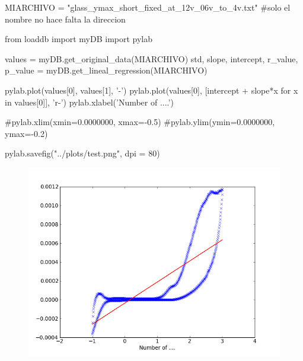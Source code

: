 \documentclass[a4paper,arial,10pt]{article}
\begin{document}
\begin{sagesilent}
MIARCHIVO = "glass_ymax_short_fixed_at_12v_06v_to_4v.txt"
#solo el nombre no hace falta la direccion

from loaddb import myDB
import pylab

values = myDB.get_original_data(MIARCHIVO)
std, slope, intercept, r_value, p_value = myDB.get_lineal_regression(MIARCHIVO)

pylab.plot(values[0], values[1], '-')
pylab.plot(values[0], [intercept + slope*x  for x in values[0]], 'r-')
pylab.xlabel('Number of ....')

#pylab.xlim(xmin=0.0000000, xmax=-0.5)
#pylab.ylim(ymin=0.0000000, ymax=-0.2) 

pylab.savefig("../plots/test.png", dpi = 80)


\end{sagesilent}

\begin{figure}
\begin{center}
        \includegraphics[scale=0.6]{../plots/test.png}
\end{center}
\end{figure}
\end{document}
